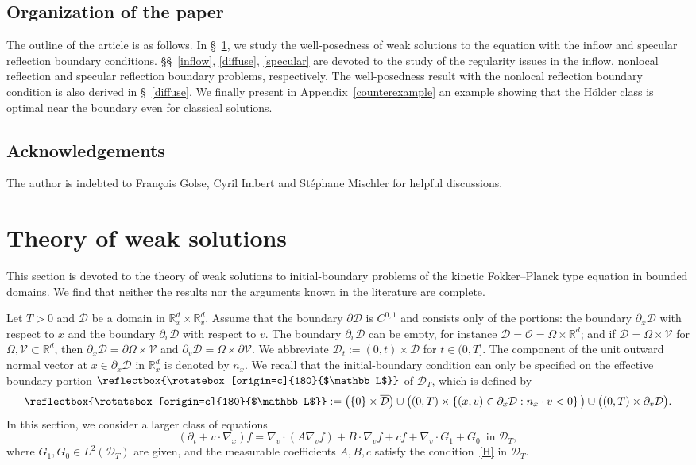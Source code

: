 \documentclass[AHL,Unicode,longabstracts,published]{cedram}
\newcommand*\p{\partial}
\newcommand*\R {\mathbb{R}}
\newcommand*\V {\mathcal{V}}
\newcommand*\D {\mathcal{D}}
\newcommand*\OO {\mathcal{O}}
\newcommand\GG{\reflectbox{\rotatebox[origin=c]{180}{$\mathbb L$}}}
\begin{document}
\subsection{Organization of the paper} 

The outline of the article is as follows. In \S~\ref{EC}, we study the well-posedness of weak solutions to the equation with the inflow and specular reflection boundary conditions. \S\S~\ref{inflow}, \ref{diffuse}, \ref{specular} are devoted to the study of the regularity issues in the inflow, nonlocal reflection and specular reflection boundary problems, respectively. The well-posedness result with the nonlocal reflection boundary condition is also derived in \S~\ref{diffuse}. We finally present in Appendix~\ref{counterexample} an example showing that the H\"older class is optimal near the boundary even for classical solutions.

\subsection*{Acknowledgements}

The author is indebted to François Golse, Cyril Imbert and Stéphane Mischler for helpful discussions.

\section{Theory of weak solutions}\label{EC}
This section is devoted to the theory of weak solutions to initial-boundary problems of the kinetic Fokker--Planck type equation in bounded domains. We find that neither the results nor the arguments known in the literature are complete.

Let $T>0$ and $\D$ be a domain in $\R^d_x\times\R^d_v$. Assume that the boundary $\p\D$ is $C^{0,1}$ and consists only of the portions: the boundary $\p_x\D$ with respect to $x$ and the boundary $\p_v\D$ with respect to $v$. The boundary $\p_v\D$ can be empty, for instance $\D=\OO=\Omega\times\R^d$; and if $\D=\Omega\times\V$ for $\Omega,\V\subset\R^d$, then $\p_x\D=\p\Omega\times\V$ and $\p_v\D=\Omega\times\p\V$. We abbreviate $\D_t:=(0,t)\times\D$ for $t\in(0,T]$. The component of the unit outward normal vector at $x\in\p_x\D$ in $\R_x^d$ is denoted by $n_x$. We recall that the initial-boundary condition can only be specified on the effective boundary portion $\GG$ of $\D_T$, which is defined by
\begin{align*}
\GG:=\left(\{0\}\times\overline{\D}\right)
\cup\big((0,T)\times\left\{(x,v)\in\p_x\D:n_x\cdot v<0\right\}\big)
\cup\big((0,T)\times\p_v\D\big).
\end{align*}
In this section, we consider a larger class of equations
\begin{equation}\label{existence}
(\partial_t+v\cdot\nabla_x)f =\nabla_v\cdot\left(A\nabla_v f\right) +B\cdot\nabla_vf +cf +\nabla_v\cdot G_1 +G_0\ \; \text{in}\;\D_T,
\end{equation}
where $G_1,G_0\in L^2(\D_T)$ are given, and the measurable coefficients $A,B,c$ satisfy the condition~\eqref{H} in $\D_T$.
\end{document}
